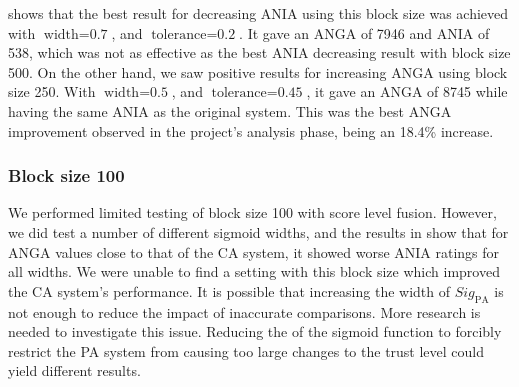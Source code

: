  shows that the best result for decreasing ANIA using this block size was achieved with $\text{width} = \text{0.7}$, and $\text{tolerance} = \text{0.2}$.
It gave an ANGA of 7946 and ANIA of 538, which was not as effective as the best ANIA decreasing result with block size 500.
On the other hand, we saw positive results for increasing ANGA using block size 250.
With $\text{width} = \text{0.5}$, and $\text{tolerance} = \text{0.45}$, it gave an ANGA of 8745 while having the same ANIA as the original system.
This was the best ANGA improvement observed in the project's analysis phase, being an 18.4\% increase.




\subsubsection{Block size 100}
We performed limited testing of block size 100 with score level fusion.
However, we did test a number of different sigmoid widths, and the results in  show that for ANGA values close to that of the CA system, it showed worse ANIA ratings for all widths.
We were unable to find a setting with this block size which improved the CA system's performance.
It is possible that increasing the width of $\textit{Sig}_{\text{PA}}$ is not enough to reduce the impact of inaccurate comparisons.
More research is needed to investigate this issue. 
Reducing the  of the sigmoid function to forcibly restrict the PA system from causing too large changes to the trust level could yield different results.

